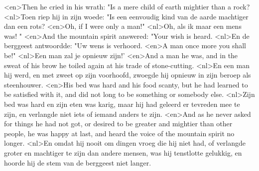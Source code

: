 <en>Then he cried in his wrath: "Is a mere child of earth mightier than a rock?
<nl>Toen riep hij in zijn woede: "Is een eenvoudig kind van de aarde machtiger dan een rots?
<en>Oh, if I were only a man!"
<nl>Oh, als ik maar een mens was! "
<en>And the mountain spirit answered: "Your wish is heard.
<nl>En de berggeest antwoordde: "Uw wens is verhoord.
<en>A man once more you shall be!"
<nl>Een man zal je opnieuw zijn!'
<en>And a man he was, and in the sweat of his brow he toiled again at his trade of stone-cutting.
<nl>En een man hij werd, en met zweet op zijn voorhoofd, zwoegde hij opnieuw in zijn beroep als steenhouwer.
<en>His bed was hard and his food scanty, but he had learned to be satisfied with it, and did not long to be something or somebody else.
<nl>Zijn bed was hard en zijn eten was karig, maar hij had geleerd er tevreden mee te zijn, en verlangde niet iets of iemand anders te zijn.
<en>And as he never asked for things he had not got, or desired to be greater and mightier than other people, he was happy at last, and heard the voice of the mountain spirit no longer.
<nl>En omdat hij nooit om dingen vroeg die hij niet had, of verlangde  groter en machtiger te zijn dan andere mensen, was hij tenstlotte gelukkig, en hoorde hij de stem van de berggeest niet langer.
